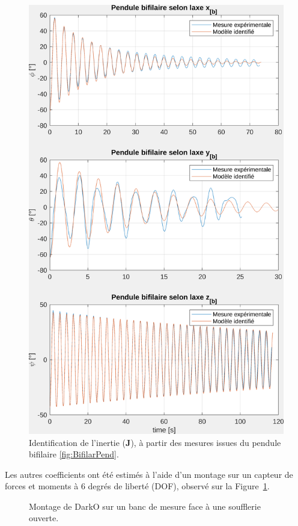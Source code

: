     \begin{figure}[ht]
    \centerline{
    \includegraphics[trim=0cm 0cm 0cm 0cm,clip,width=0.6\columnwidth]{figures/ident_inertia.png}}
    \caption{Identification de l'inertie ($\boldsymbol{J}$), à partir des mesures issues du pendule bifilaire \ref{fig:BifilarPend}.}
    \label{fig:BifilarPend_meas}
    \end{figure}


    
    Les autres coefficients ont été estimés à l'aide d'un montage sur un capteur de forces et moments à 6 degrés de liberté (DOF), observé sur la Figure~\ref{fig:BifilarPend_meas}. 
    \begin{figure}[ht]
        \centering
        \caption{Montage de DarkO sur un banc de mesure face à une soufflerie ouverte.}
        \label{fig:montage_ident}
    \end{figure}

